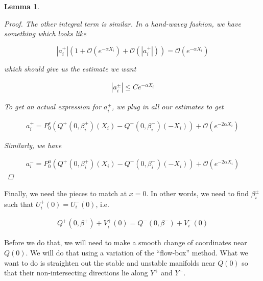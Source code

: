 \documentclass[12pt]{article}
\newtheorem{lemma}{Lemma}
\begin{document}
\begin{lemma}
\begin{proof}
The other integral term is similar. In a hand-wavey fashion, we have something which looks like

\[
|a_i^+|(1 + \mathcal{O}(e^{-\alpha X_i}) + \mathcal{O}(|a_i^+|)) = 
\mathcal{O}( e^{-\alpha X_i} )
\]

which should give us the estimate we want

\begin{align*}
|a_i^\pm| \leq C e^{-\alpha X_i}
\end{align*}

To get an actual expression for $a_i^\pm$, we plug in all our estimates to get

\begin{align*}
a_i^+ = P^s_0 \left( Q^+(0, \beta_i^+)(X_i) - Q^-(0, \beta_i^-)(-X_i) \right) 
+ \mathcal{O}( e^{-2 \alpha X_i} )
\end{align*}

Similarly, we have

\begin{align*}
a_i^- = P^u_0 \left( Q^+(0, \beta_i^+)(X_i) - Q^-(0, \beta_i^-)(-X_i) \right) 
+ \mathcal{O}( e^{-2 \alpha X_i} )
\end{align*}

\end{proof}
\end{lemma}

Finally, we need the pieces to match at $x = 0$. In other words, we need to find $\beta_i^\pm$ such that $U_i^+(0) = U_i^-(0)$, i.e. 

\begin{align*}
Q^+(0, \beta^+) + V_i^+(0) = Q^-(0, \beta^-) + V_i^-(0)
\end{align*}

Before we do that, we will need to make a smooth change of coordinates near $Q(0)$. We will do that using a variation of the ``flow-box'' method. What we want to do is straighten out the stable and unstable manifolds near $Q(0)$ so that their non-intersecting directions lie along $Y^+$ and $Y^-$.

\end{document}
